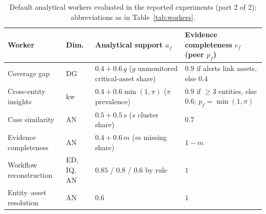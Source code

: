 \begin{table}[!htbp]
\caption{Default analytical workers evaluated in the reported experiments (part 2 of
2); abbreviations as in Table~\ref{tab:workers}.}
\label{tab:workers-b}
\centering
\small
\setlength{\tabcolsep}{3pt}
\begin{tabular}{@{}L{2.7cm}L{0.9cm}L{4.4cm}L{3.5cm}@{}}
\toprule
Worker & Dim. & Analytical support $a_f$ & Evidence completeness $e_f$ (peer $p_f$) \\
\midrule
Coverage gap & DG & $0.4+0.6\,g$ ($g$ unmonitored critical-asset share) & $0.9$ if alerts link assets, else $0.4$ \\
Cross-entity insights & kw & $0.4+0.6\min(1,\pi)$ ($\pi$ prevalence) & $0.9$ if ${\ge}3$ entities, else $0.6$; $p_f=\min(1,\pi)$ \\
Case similarity & AN & $0.5+0.5\,s$ ($s$ cluster share) & $0.7$ \\
Evidence completeness & AN & $0.4+0.6\,m$ ($m$ missing share) & $1-m$ \\
Workflow reconstruction & ED, IQ, AN & $0.85$ / $0.8$ / $0.6$ by rule & $1$ \\
Entity--asset resolution & AN & $0.6$ & $1$ \\
\bottomrule
\end{tabular}
\end{table}
